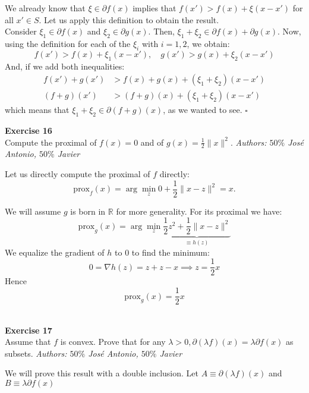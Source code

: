 \documentclass[11pt,table]{article}
\newcommand{\qed}{\hfill $\square$}
\newenvironment{problem}[2][Exercise]
{ \begin{mdframed}[backgroundcolor=gray!20] \textbf{#1 #2} \\}
	{\hspace{0.0cm}\newline\newline \emph{Authors: \(50\%\) José Antonio, \(50\%\) Javier}  \end{mdframed}}
\newcommand\R{\mathbb R}
\begin{document}
	We already know that \(\xi \in \partial f(x)\) implies that \(f(x') > f(x) + \xi(x-x')\) for all \(x' \in S\). Let us apply this definition to obtain the result.\\
	Consider \(\xi_1 \in \partial f(x)\) and \(\xi_2 \in \partial g(x)\). Then, \(\xi_1 + \xi_2 \in \partial f(x) + \partial g(x)\). Now, using the definition for each of the \(\xi_i\) with \(i = 1,2\), we obtain:
	\[
	f(x') > f(x) + \xi_1 (x-x'), \quad g(x') > g(x) + \xi_2(x-x')
	\]
	And, if we add both inequalities:
	\begin{align*}
		f(x') + g(x')        & > f(x) + g(x) + (\xi_1 + \xi_2)(x-x')        \\
		\left(f+g\right)(x') & >\left(f+g\right)(x) + (\xi_1 + \xi_2)(x-x')
	\end{align*}
	which means that \(\xi_1 + \xi_2 \in \partial \left(f+g\right)(x) \), as we wanted to see. \qed \\
	
	\begin{problem}{16}
		Compute the proximal of \( f(x) = 0 \) and of \( g(x) = \frac{1}{2}\|x\|^2 \).
	\end{problem}
	
	Let us directly compute the proximal of $f$ directly:
	\[
	\text{prox}_f(x) = \arg \min_z 0 + \frac{1}{2} \parallel x - z \parallel^2 = x.
	\]
	
	We will assume $g$ is born in $\R$ for more generality. For its proximal we have:
	\[
	\text{prox}_g(x) = \arg \min_z \underbrace{\frac{1}{2}z^2 + \frac{1}{2} \parallel x - z \parallel^2}_{\equiv h(z)}
	\]
	We equalize the gradient of $h$ to $0$ to find the minimum:
	\[
	0 = \nabla h(z) = z + z - x \implies z = \frac{1}{2}x
	\]
	Hence
	\[
	\text{prox}_g(x) =  \frac{1}{2} x
	\] \\
	
	\begin{problem}{17}
		Assume that \( f \)  is convex. Prove that for any \( \lambda > 0, \partial(\lambda f)(x) = \lambda \partial f(x) \) as subsets.
	\end{problem}
	
	We will prove this result with a double inclusion. Let $A \equiv \partial(\lambda f)(x)$ and $B \equiv \lambda \partial f(x)$
	
\end{document}
